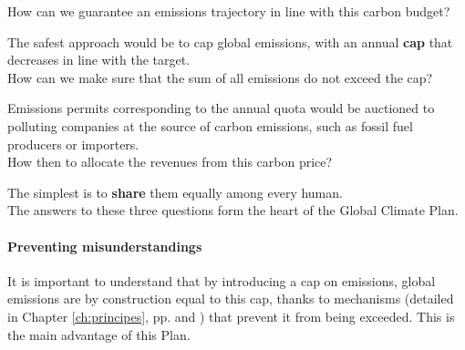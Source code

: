 \documentclass[a5paper,english,openany]{memoir}
\begin{document}
How can we guarantee an emissions trajectory in line with this carbon budget? 

The safest approach would be to cap global emissions, with an annual \textbf{cap} that decreases in line with the target. \\

How can we make sure that the sum of all emissions do not exceed the cap?

Emissions permits corresponding to the annual quota would be auctioned to polluting companies at the source of carbon emissions, such as fossil fuel producers or importers.\\

How then to allocate the revenues from this carbon price? 

The simplest %
is to \textbf{share} them equally among every human. \\






The answers to these three questions form the heart of the Global Climate Plan. %
\paragraph{Preventing misunderstandings}
It is important to understand that by introducing a cap on emissions, global emissions are by construction equal to this cap, thanks to mechanisms (detailed in Chapter \ref{ch:principes}, pp. \pageref{sec:pcp_quota} and \pageref{sec:implementation}) that prevent it from being exceeded. This is the main advantage of this Plan. %
\end{document}
